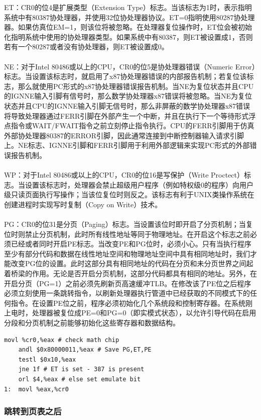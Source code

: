 \documentclass[12pt]{article}
\begin{document}
ET：CR0的位4是扩展类型（Extension Type）标志。当该标志为1时，表示指明系统中有80387协处理器，并使用32位协处理器协议。ET=0指明使用80287协处理器。如果仿真位EM=1，则该位将被忽略。在处理器复位操作时，ET位会被初始化指明系统中使用的协处理器类型。如果系统中有80387，则ET被设置成1，否则若有一个80287或者没有协处理器，则ET被设置成0。\\\\
NE：对于Intel 80486或以上的CPU，CR0的位5是协处理器错误（Numeric Error）标志。当设置该标志时，就启用了x87协处理器错误的内部报告机制；若复位该标志，那么就使用PC形式的x87协处理器错误报告机制。当NE为复位状态并且CPU的IGNNE输入引脚有信号时，那么数学协处理器x87错误将被忽略。当NE为复位状态并且CPU的IGNNE输入引脚无信号时，那么非屏蔽的数学协处理器x87错误将导致处理器通过FERR引脚在外部产生一个中断，并且在执行下一个等待形式浮点指令或WAIT/FWAIT指令之前立刻停止指令执行。CPU的FERR引脚用于仿真外部协处理器80387的ERROR引脚，因此通常连接到中断控制器输入请求引脚上。NE标志、IGNNE引脚和FERR引脚用于利用外部逻辑来实现PC形式的外部错误报告机制。\\\\
WP：对于Intel 80486或以上的CPU，CR0的位16是写保护（Write Proctect）标志。当设置该标志时，处理器会禁止超级用户程序（例如特权级0的程序）向用户级只读页面执行写操作；当该位复位时则反之。该标志有利于UNIX类操作系统在创建进程时实现写时复制（Copy on Write）技术。\\\\
PG：CR0的位31是分页（Paging）标志。当设置该位时即开启了分页机制；当复位时则禁止分页机制，此时所有线性地址等同于物理地址。在开启这个标志之前必须已经或者同时开启PE标志。当改变PE和PG位时，必须小心。只有当执行程序至少有部分代码和数据在线性地址空间和物理地址空间中具有相同地址时，我们才能改变PG位的设置。此时这部分具有相同地址的代码在分页和未分页世界之间起着桥梁的作用。无论是否开启分页机制，这部分代码都具有相同的地址。另外，在开启分页（PG=1）之前必须先刷新页高速缓冲TLB。在修改该了PE位之后程序必须立刻使用一条跳转指令，以刷新处理器执行管道中已经获取的不同模式下的任何指令。在设置PE位之前，程序必须初始化几个系统段和控制寄存器。在系统刚上电时，处理器被复位成PE=0和PG=0（即实模式状态），以允许引导代码在启用分段和分页机制之前能够初始化这些寄存器和数据结构。
\begin{lstlisting}[breaklines]
	movl %cr0,%eax # check math chip
	andl $0x80000011,%eax # Save PG,ET,PE
	testl $0x10,%eax
	jne 1f # ET is set - 387 is present
	orl $4,%eax	# else set emulate bit
1:	movl %eax,%cr0
\end{lstlisting}
\subsubsection{跳转到页表之后}	
\end{document}
